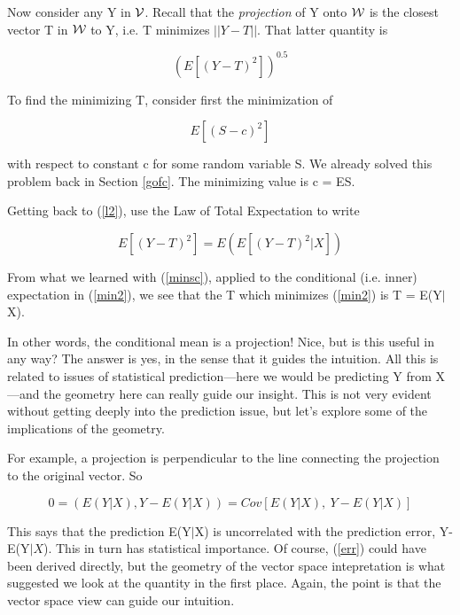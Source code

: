 Now consider any Y in $\cal V$.  Recall that the {\it projection} of Y
onto $\cal W$ is the closest vector T in $\cal W$ to Y, i.e. T minimizes
$||Y-T||$.  That latter quantity is 

\begin{equation}
\label{l2}
{\left ( E[{(Y-T)}^2] \right )}^{0.5}
\end{equation}

To find the minimizing T, consider first the minimization of

\begin{equation}
\label{minsc}
E[{(S-c)}^2]
\end{equation}

with respect to constant c for some random variable S.  We already
solved this problem back in Section \ref{gofc}.  The minimizing value 
is c = ES.

Getting back to (\ref{l2}), use the Law of Total Expectation to write

\begin{equation}
\label{min2}
E[{(Y-T)}^2] = E \left (  E[{(Y-T)}^2|X]\right )
\end{equation}

From what we learned with (\ref{minsc}), applied to the conditional
(i.e. inner) expectation in (\ref{min2}), we see that the T which
minimizes (\ref{min2}) is T = E(Y$|$X).  

In other words, the conditional mean is a projection!  Nice, but is this
useful in any way?  The answer is yes, in the sense that it guides the
intuition.  All this is related to issues of statistical
prediction---here we would be predicting Y from X---and the geometry
here can really guide our insight.  This is not very evident without
getting deeply into the prediction issue, but let's explore some of the
implications of the geometry.

For example, a projection is perpendicular to the line connecting the
projection to the original vector.  So

\begin{equation}
\label{err}
0 = (E(Y|X),Y-E(Y|X)) 
= Cov[E(Y|X), ~ Y-E(Y|X)]
\end{equation}

This says that the prediction E(Y$|$X) is uncorrelated with the
prediction error, Y-E(Y$|X$).  This in turn has statistical importance.
Of course, (\ref{err}) could have been derived directly, but the
geometry of the vector space intepretation is what suggested we look at
the quantity in the first place.  Again, the point is that the vector
space view can guide our intuition.

